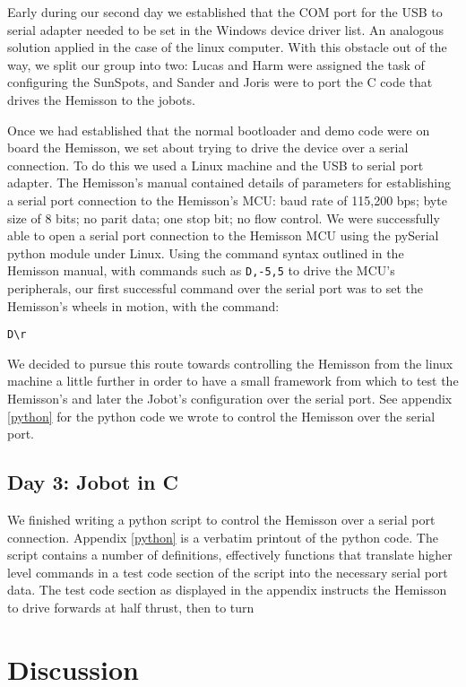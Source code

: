 \documentclass[a4paper, 12pt, titlepage]{article}
\begin{document}
Early during our second day we established that the COM port for the USB to
serial adapter needed to be set in the Windows device driver list. An analogous
solution applied in the case of the linux computer. With this obstacle out of
the way, we split our
group into two: Lucas and Harm were assigned the task of configuring the
SunSpots, and Sander and Joris were to port the C code that drives the Hemisson
to the jobots. 


Once we had established that the normal bootloader and demo code were on board
the Hemisson, we set about trying to drive the device over a serial connection.
To do this we used a Linux machine and the USB to serial port adapter. The
Hemisson's manual contained details of parameters for establishing a serial port 
connection to the Hemisson's MCU: baud rate of 115,200 bps; byte size of 8 bits; 
no parit
data; one stop bit; no flow control. We were successfully able to open a serial
port connection to the Hemisson MCU using the pySerial python module under
Linux. Using the command syntax outlined in the Hemisson manual, with commands
such as \texttt{D,-5,5} to drive the MCU's peripherals, our first successful
command over the serial port was to set the Hemisson's wheels in motion, with
the command: 
\begin{verbatim}D\r\end{verbatim}
We decided to pursue this route towards controlling the Hemisson from the linux
machine a little further in order to have a small framework from which to test
the Hemisson's and later the Jobot's configuration over the serial port.
See appendix \ref{python} for the python code we wrote to
control the Hemisson over the serial port.



\subsection{Day 3: Jobot in C} %


We finished writing a python script to control the Hemisson over a serial port 
connection. Appendix \ref{python} is a verbatim printout of the
python code. The script contains a number of definitions, effectively functions
that translate higher level commands in a test code section of the script into
the necessary serial port data. The test code section as displayed in the
appendix instructs the Hemisson to drive forwards at half thrust, then to turn 


\section{Discussion}
\end{document}

